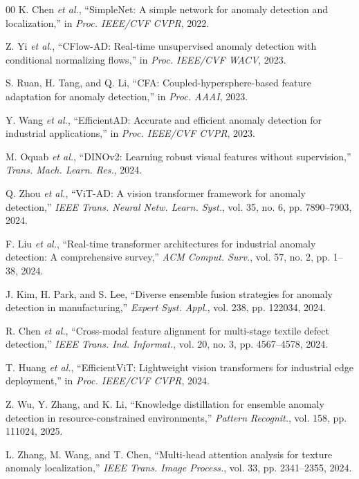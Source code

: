 \documentclass[journal]{IEEEtran}
\begin{document}
\begin{thebibliography}{00}
K. Chen \textit{et al.}, ``SimpleNet: A simple network for anomaly detection and localization,'' in \textit{Proc. IEEE/CVF CVPR}, 2022.

Z. Yi \textit{et al.}, ``CFlow-AD: Real-time unsupervised anomaly detection with conditional normalizing flows,'' in \textit{Proc. IEEE/CVF WACV}, 2023.

S. Ruan, H. Tang, and Q. Li, ``CFA: Coupled-hypersphere-based feature adaptation for anomaly detection,'' in \textit{Proc. AAAI}, 2023.

Y. Wang \textit{et al.}, ``EfficientAD: Accurate and efficient anomaly detection for industrial applications,'' in \textit{Proc. IEEE/CVF CVPR}, 2023.

M. Oquab \textit{et al.}, ``DINOv2: Learning robust visual features without supervision,'' \textit{Trans. Mach. Learn. Res.}, 2024.

Q. Zhou \textit{et al.}, ``ViT-AD: A vision transformer framework for anomaly detection,'' \textit{IEEE Trans. Neural Netw. Learn. Syst.}, vol. 35, no. 6, pp. 7890--7903, 2024.

F. Liu \textit{et al.}, ``Real-time transformer architectures for industrial anomaly detection: A comprehensive survey,'' \textit{ACM Comput. Surv.}, vol. 57, no. 2, pp. 1--38, 2024.

J. Kim, H. Park, and S. Lee, ``Diverse ensemble fusion strategies for anomaly detection in manufacturing,'' \textit{Expert Syst. Appl.}, vol. 238, pp. 122034, 2024.

R. Chen \textit{et al.}, ``Cross-modal feature alignment for multi-stage textile defect detection,'' \textit{IEEE Trans. Ind. Informat.}, vol. 20, no. 3, pp. 4567--4578, 2024.

T. Huang \textit{et al.}, ``EfficientViT: Lightweight vision transformers for industrial edge deployment,'' in \textit{Proc. IEEE/CVF CVPR}, 2024.

Z. Wu, Y. Zhang, and K. Li, ``Knowledge distillation for ensemble anomaly detection in resource-constrained environments,'' \textit{Pattern Recognit.}, vol. 158, pp. 111024, 2025.

L. Zhang, M. Wang, and T. Chen, ``Multi-head attention analysis for texture anomaly localization,'' \textit{IEEE Trans. Image Process.}, vol. 33, pp. 2341--2355, 2024.


\end{thebibliography}
\end{document}
